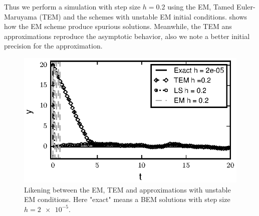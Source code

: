 \begin{example}
\begin{enumerate}[(i)]
	\end{enumerate}
	Thus we perform a simulation with step size $h=\num{0.2}$  using 
	the EM, Tamed Euler-Maruyama (TEM) and the \SM schemes with unstable EM initial conditions. 
	 shows how the EM scheme produce spurious solutions. Meanwhile, the TEM ans \SM 
	approximations
	reproduce the asymptotic behavior, also we note a better initial precision for the \SM approximation. 
	\begin{figure}[h]
		\begin{center}
			\includegraphics{papers/paperB/figures/ApplebyEx}
		\end{center}
		\caption{Likening between the EM, TEM and \SM approximations with unstable EM conditions. Here "exact" means
			a BEM solutions with step size $h=\num{2e-5}$.}
		\label{fig:pathsAppleby}
	\end{figure}
\end{example}

